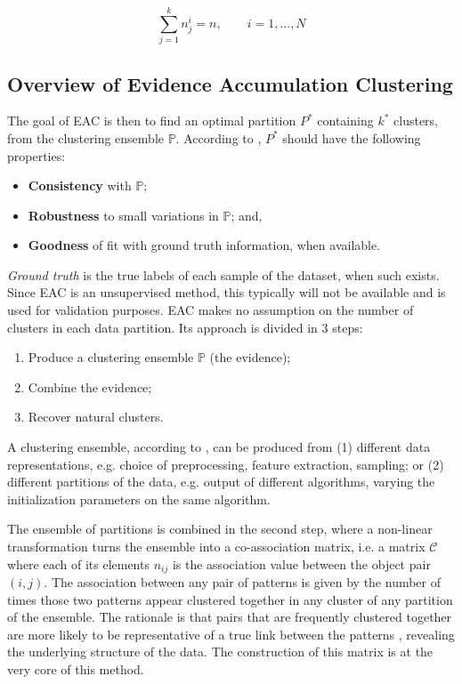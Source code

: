 \begin{equation}
\sum_{j=1}^{k} n_j^i = n, \qquad i = 1, ..., N
\end{equation}

\subsection{Overview of Evidence Accumulation Clustering}

The goal of EAC is then to find an optimal partition $P^*$ containing $k^*$ clusters, from the clustering ensemble $\mathbb{P}$. According to \cite{Fred2005}, $P^*$ should have the following properties:

\begin{itemize}
	\item \textbf{Consistency} with $\mathbb{P}$;
	\item \textbf{Robustness} to small variations in $\mathbb{P}$; and,
	\item \textbf{Goodness} of fit with ground truth information, when available.
\end{itemize}

\emph{Ground truth} is the true labels of each sample of the dataset, when such exists. Since EAC is an unsupervised method, this typically will not be available and is used for validation purposes.
EAC makes no assumption on the number of clusters in each data partition.
Its approach is divided in 3 steps:

\begin{enumerate}
\item Produce a clustering ensemble $\mathbb{P}$ (the evidence);
\item Combine the evidence;
\item Recover natural clusters.
\end{enumerate}

A clustering ensemble, according to \cite{Fred2005}, can be produced from (1) different data representations, e.g. choice of preprocessing, feature extraction, sampling; or (2) different partitions of the data, e.g. output of different algorithms, varying the initialization parameters on the same algorithm.

The ensemble of partitions is combined in the second step, where a non-linear transformation turns the ensemble into a co-association matrix, i.e. a matrix $\mathcal{C}$ where each of its elements $n_{ij}$ is the association value between the object pair $(i,j)$.
The association between any pair of patterns is given by the number of times those two patterns appear clustered together in any cluster of any partition of the ensemble.
The rationale is that pairs that are frequently clustered together are more likely to be representative of a true link between the patterns \cite{Fred2005}, revealing the underlying structure of the data.
The construction of this matrix is at the very core of this method.

